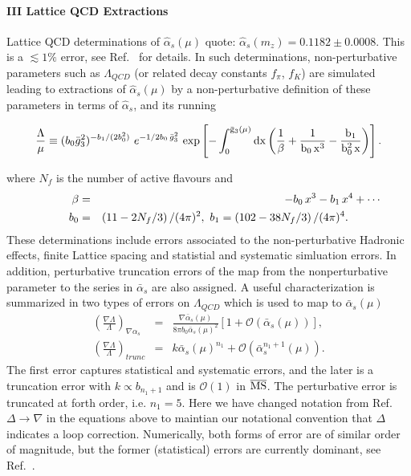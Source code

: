 \documentclass[twocolumn,nofootinbib,amsmath,amssymb,prl,aps,superscriptaddress,tightenlines,preprintnumbers]{revtex4}
\newcommand{\bea}{\begin{eqnarray}}
\newcommand{\eea}{\end{eqnarray}}
\begin{document}
\paragraph{\bf III Lattice QCD Extractions}\label{lattice}
Lattice QCD determinations of $\hat{\alpha}_s(\mu)$ quote:
$\hat{\alpha}_s(m_z) = 0.1182\pm 0.0008$. This is a $\lesssim 1 \%$ error, see Ref.~\cite{FlavourLatticeAveragingGroup:2019iem}
for details.
In such determinations,
non-perturbative parameters
such as $\Lambda_{QCD}$ (or related decay constants $f_{\pi}$, $f_{K}$) are simulated leading to extractions
of $\hat{\alpha}_s(\mu)$ by a non-perturbative definition of these parameters
in terms of $\hat{\alpha}_s$, and its running
\begin{widetext}
\bea
\frac{\Lambda}{\mu} \equiv  (b_0 \bar{g}_3^2)^{- b_1/(2 b_0^2)} \,\, e^{-1/2 b_0 \, \bar{g}_3^2} \,\, \rm exp \left[
- \int_0^{\bar{g}_3(\mu)} dx \left(\frac{1}{\beta} + \frac{1}{b_0 \, x^3} - \frac{b_1}{b_0^2 \,x}\right) \right].
\eea
\end{widetext}
where $N_f$ is the number of active flavours and
\bea
\beta &=& - b_0  \, x^3 - b_1 \, x^4 + \cdots  \hspace{-1cm}\\
b_0 &=& \left(11 - 2 N_f/3 \right)/(4 \pi)^2, \, \,
b_1 = \left(102 - 38 N_f/3 \right)/(4 \pi)^4. \nonumber
\eea
These determinations include errors associated
to the non-perturbative Hadronic effects,
finite Lattice spacing and statistial and systematic simluation errors.
In addition, perturbative truncation errors of the map from the nonperturbative parameter
to the series in $\bar{\alpha}_s$ are also assigned.
A useful characterization is
summarized in two types of errors on $\Lambda_{QCD}$ which is used to map to $\bar{\alpha}_s(\mu)$
 \cite{FlavourLatticeAveragingGroup:2019iem}
\bea\label{saterrors}
\left(\frac{\nabla \Lambda}{\Lambda}\right)_{\nabla \alpha_s} &=& \frac{\nabla \bar{\alpha}_s(\mu)}{8 \pi b_0 \bar{\alpha}_s(\mu)^2}\left[1+ \mathcal{O}(\bar{\alpha}_s(\mu))\right], \\
\left(\frac{\nabla \Lambda}{\Lambda}\right)_{trunc} &=& k \bar{\alpha}_s(\mu)^{n_1} + \mathcal{O}(\bar{\alpha}_s^{n_1+1}(\mu)).
\eea
The first error captures statistical and systematic errors, and the later is a truncation error
with $k \propto b_{n_1+1}$ and is $\mathcal{O}(1)$ in $\rm \overline{MS}$.
The perturbative error is truncated at forth order, i.e. $n_1 = 5$.
Here we have changed
notation from Ref.~\cite{FlavourLatticeAveragingGroup:2019iem} $\Delta \rightarrow \nabla$
in the equations above
to maintian our notational convention that $\Delta$ indicates a loop correction.
Numerically, both forms of error are of similar order of magnitude, but
the former (statistical) errors  are currently dominant,
see Ref.~\cite{DallaBrida:2018cmc,FlavourLatticeAveragingGroup:2019iem}.
\end{document}

